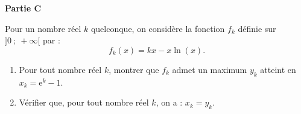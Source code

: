 \medskip

\textbf{Partie C}

\medskip

Pour un nombre réel $k$ quelconque, on considère la fonction $f_k$ définie sur $]0~;~+\infty[$ par : \[f_k(x) = kx - x \ln (x).\]
%
\begin{enumerate}
	\item Pour tout nombre réel $k$, montrer que $f_k$ admet un maximum $y_k$ atteint en $x_k = \text{e}^k- 1$.
	\item  Vérifier que, pour tout nombre réel $k$, on a : $x_k = y_k$.
\end{enumerate}

